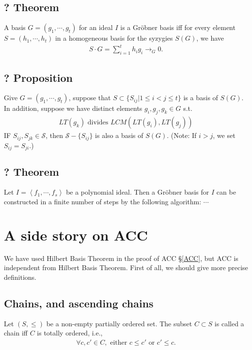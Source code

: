 \documentclass[11pt]{book}
\begin{document}
\subsection{? Theorem}
A basis $G = (g_1, \cdots, g_t)$ for an ideal $I$ is a Gr\"obner basis iff for every element $S = (h_1, \cdots, h_t)$ in a homogeneous basis for the syzygies $S(G)$, we have
\begin{eqnarray}
S \cdot G = \sum_{i = 1}^t h_i g_i \to_G 0.
\end{eqnarray}

\subsection{? Proposition} 
Give $G = (g_1, \cdots, g_t)$, suppose that $S \subset \{S_{ij} | 1 \leq i < j \leq t\}$ is a basis of $S(G)$.
In addition, suppose we have distinct elements $g_i, g_j, g_k \in G$ s.t.
\begin{eqnarray}
LT(g_k) \text{ divides } LCM( LT(g_i), LT(g_j))
\end{eqnarray}
IF $S_{ij}, S_{jk} \in \mathcal{S}$, then $\mathcal{S} -\{ S_{ij} \}$ is also a basis of $S(G)$.
(Note: If $i > j$, we set $S_{ij} = S_{ji}$.)

\subsection{? Theorem}
Let $I = \left< f_1, \cdots, f_s \right>$ be a polynomial ideal.
Then a Gr\"obner basis for $I$ can be constructed in a finite number of steps by the following algorithm: $\cdots$

\section{A side story on ACC}
We have used Hilbert Basis Theorem in the proof of ACC \S\ref{ACC}, but ACC is independent from Hilbert Basis Theorem.
First of all, we should give more precise definitions.

\subsection{Chains, and ascending chains}
Let $(S, \leq)$ be a non-empty partially ordered set.
The subset $C \subset S$ is called a chain iff $C$ is totally ordered, i.e.,
\begin{eqnarray}
\forall c,c' \in C, \text{ either } c \leq c' \text{ or } c' \leq c.
\end{eqnarray}
\end{document}
